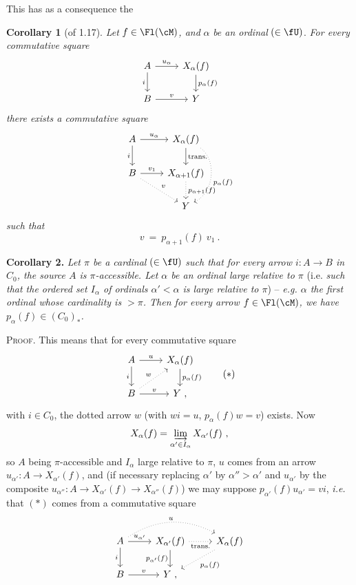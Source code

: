 This has as a consequence the

\textbf{Corollary 1} (of 1.17). \textit{Let} $f \in \Fl(\cM)$\textit{, and} $\alpha$ \textit{be an ordinal} $(\in \fU)$. \textit{For every commutative square}
\[
\begin{tikzcd}
A \arrow[r, "u_\alpha"] \arrow[d, "i"'] & X_\alpha(f) \arrow[d, "p_\alpha(f)"] \\
B \arrow[r, "v"] & Y
\end{tikzcd}
\]
\textit{there exists a commutative square}
\[
\begin{tikzcd}
A \arrow[r, "u_\alpha"] \arrow[d, "i"'] & X_\alpha(f) \arrow[d, "\text{trans.}"] \arrow[dd, dotted, bend left=60, "p_\alpha(f)"] \\
B \arrow[r, "v_1"] \arrow[dr, dotted, "v"] & X_{\alpha+1}(f) \arrow[d, dotted, "p_{\alpha+1}(f)"] \\
 & Y
\end{tikzcd}
\]
\textit{such that}
\[
v \ = \ p_{\alpha+1}(f)\ v_1 \ .
\]


\textbf{Corollary 2.} \textit{Let $\pi$ be a cardinal} $(\in \fU)$ \textit{such that for every arrow $i : A \longrightarrow B$ in $C_0$, the source $A$ is $\pi$-accessible. Let $\alpha$ be an ordinal large relative to $\pi$} (i.e. \textit{such that the ordered set $I_\alpha$ of ordinals $\alpha' < \alpha$ is large relative to $\pi$}) -- \textit{e.g. $\alpha$ the first ordinal whose cardinality is $> \pi$. Then for every arrow $f \in \Fl(\cM)$, we have $p_\alpha(f) \in (C_0)_*$.}

\textsc{Proof}. This means that for every commutative square
\[
\begin{tikzcd}
A \arrow[r, "u"] \arrow[d, "i"'] & X_\alpha(f) \arrow[d, "p_\alpha(f)"] \\
B \arrow[r, "v"] \arrow[ur, dotted, "w"] & Y \ ,
\end{tikzcd}
\tag*{$(*)$}
\]
with $i \in C_0$, the dotted arrow $w$ (with $wi = u$, $p_\alpha(f)w = v$) exists. Now
\[
X_\alpha(f) = \varinjlim_{\alpha' \in I_\alpha} X_{\alpha'}(f) \ ,
\]
so $A$ being $\pi$-accessible and $I_\alpha$ large relative to $\pi$, $u$ comes from an arrow $u_{\alpha'} : A \longrightarrow X_{\alpha'}(f)$, and (if necessary replacing $\alpha'$ by $\alpha'' > \alpha'$ and $u_{\alpha'}$ by the composite $u_{\alpha''} : A \longrightarrow X_{\alpha'}(f) \longrightarrow X_{\alpha''}(f)$) we may suppose $p_{\alpha'}(f)u_{\alpha'} = vi$, \textit{i.e.} that $(*)$ comes from a commutative square
\[
\begin{tikzcd}
A \arrow[r, "u_{\alpha'}"] \arrow[d, "i"'] \arrow[rr, dotted, bend left=30, "u"] & X_{\alpha'}(f) \arrow[r, dotted, "\text{trans.}"'] \arrow[d, "p_{\alpha'}(f)"'] & X_\alpha(f) \arrow[dl, dotted, "p_\alpha(f)"] \\
B \arrow[r, "v"] & Y \ , &
\end{tikzcd}
\]

